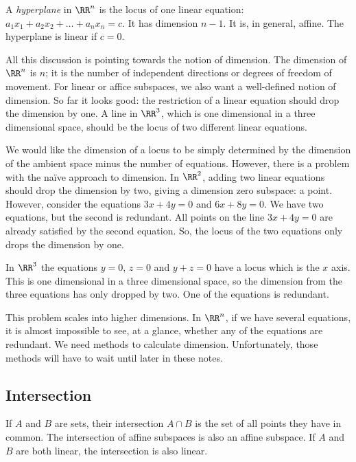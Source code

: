 \documentclass[fleqn]{report}
\begin{document}
\begin{defn}
A \emph{hyperplane} in $\RR^n$ is the locus of one linear
equation: $a_1 x_1 + a_2 x_2 + \ldots + a_n x_n = c$. It has
dimension $n-1$. It is, in general, affine. The hyperplane is
linear if $c=0$. 
\end{defn}

All this discussion is pointing towards the notion of
dimension. The dimension of $\RR^n$ is $n$; it is the number
of independent directions or degrees of freedom of movement.
For linear or affice subspaces, we also want a well-defined
notion of dimension. So far it looks good: the restriction of
a linear equation should drop the dimension by one. A
line in $\RR^3$, which is one dimensional in a three
dimensional space, should be the locus of two different linear
equations.

We would like the dimension of a locus to be simply determined by
the dimension of the ambient space minus the number of
equations. However, there is a problem with the na\"ive approach
to dimension. In $\RR^2$, adding two linear equations should
drop the dimension by two, giving a dimension zero subspace: a
point. However, consider the equations $3x + 4y = 0$ and $6x +
8y = 0$. We have two equations, but the second is redundant.
All points on the line $3x + 4y = 0$ are already satisfied by
the second equation. So, the locus of the two equations only
drops the dimension by one.

In $\RR^3$ the equations $y=0$, $z=0$ and $y+z=0$ have a
locus which is the $x$ axis. This is one dimensional in a three
dimensional space, so the dimension from the three equations
has only dropped by two. One of the equations is redundant.

This problem scales into higher dimensions. In $\RR^n$, if we
have several equations, it is almost impossible to see, at a
glance, whether any of the equations are redundant. We need
methods to calculate dimension. Unfortunately, those methods
will have to wait until later in these notes. 

\subsection{Intersection}
\label{intersection}

\begin{defn}
If $A$ and $B$ are sets, their intersection $A \cap B$
is the set of all points they have in common. The
intersection of affine subspaces is also an
affine subspace. If $A$ and $B$ are both linear, the intersection
is also linear.
\end{defn}
\end{document}
